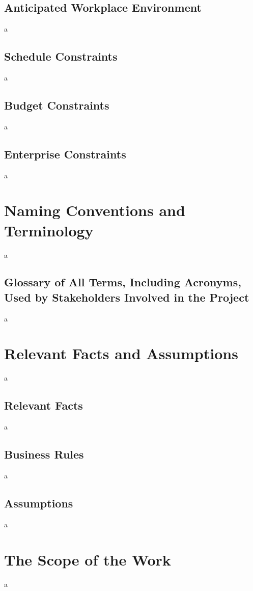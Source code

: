 \documentclass[12pt]{article}
\begin{document}
\subsection{Anticipated Workplace Environment}
a

\subsection{Schedule Constraints}
a

\subsection{Budget Constraints}
a

\subsection{Enterprise Constraints}
a

\section{Naming Conventions and Terminology}
a

\subsection{Glossary of All Terms, Including Acronyms, Used by Stakeholders Involved in the Project}
a

\section{Relevant Facts and Assumptions}
a

\subsection{Relevant Facts}
a

\subsection{Business Rules}
a

\subsection{Assumptions}
a

\section{The Scope of the Work}
a
\end{document}
